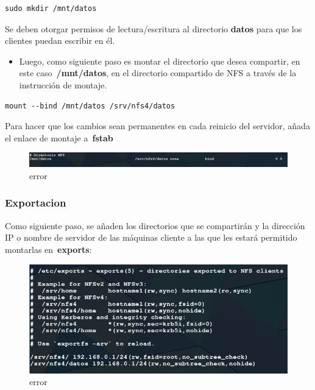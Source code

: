 \documentclass[12pt]{extarticle}
\makeatletter
\def\maxwidth{\ifdim\Gin@nat@width>\linewidth\linewidth
    \else\Gin@nat@width\fi}
\let\Oldincludegraphics\includegraphics
\renewcommand{\includegraphics}[1]{\Oldincludegraphics[width=.8\maxwidth]{#1}}
\providecommand{\tightlist}{%
      \setlength{\itemsep}{0pt}\setlength{\parskip}{0pt}}
\makeatother
\begin{document}
\begin{verbatim}
sudo mkdir /mnt/datos
\end{verbatim}

Se deben otorgar permisos de lectura/escritura al directorio
\textbf{datos} para que los clientes puedan escribir en él.

\begin{itemize}
\tightlist
\item
  Luego, como siguiente paso es montar el directorio que desea
  compartir, en este caso~\textbf{/mnt/datos}, en el directorio
  compartido de NFS a través de la instrucción de montaje.
\end{itemize}

\begin{verbatim}
mount --bind /mnt/datos /srv/nfs4/datos
\end{verbatim}

Para hacer que los cambios sean permanentes en cada reinicio del
servidor, añada el enlace de montaje a~\textbf{fstab}

\begin{figure}
\centering
\includegraphics{images/fstab.png}
\caption{error}
\end{figure}

\subsubsection{Exportacion}\label{exportacion}

Como siguiente paso, se añaden los directorios que se compartirán y la
dirección IP o nombre de servidor de las máquinas cliente a las que les
estará permitido montarlas en~\textbf{exports}:

\begin{figure}
\centering
\includegraphics{images/exports.png}
\caption{error}
\end{figure}
\end{document}
